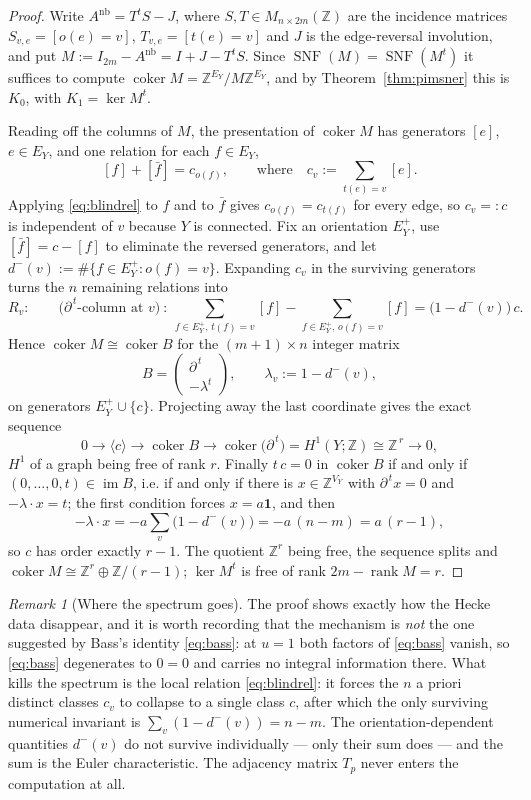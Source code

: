 \documentclass[11pt]{amsart}
\numberwithin{equation}{section}
\theoremstyle{definition}
\theoremstyle{remark}
\newtheorem{remark}[theorem]{Remark}
\newcommand{\Z}{\mathbb{Z}}
\newcommand{\coker}{\operatorname{coker}}
\newcommand{\SNF}{\operatorname{SNF}}
\newcommand{\rank}{\operatorname{rank}}
\begin{document}
\begin{proof}
Write $A^{\mathrm{nb}}=T^{t}S-J$, where $S,T\in M_{n\times2m}(\Z)$ are the incidence
matrices $S_{v,e}=[o(e)=v]$, $T_{v,e}=[t(e)=v]$ and $J$ is the edge-reversal involution,
and put $M:=I_{2m}-A^{\mathrm{nb}}=I+J-T^{t}S$. Since $\SNF(M)=\SNF(M^{t})$ it suffices
to compute $\coker M=\Z^{E_Y}/M\Z^{E_Y}$, and by Theorem~\ref{thm:pimsner} this is
$K_0$, with $K_1=\ker M^t$.

Reading off the columns of $M$, the presentation of $\coker M$ has generators $[e]$,
$e\in E_Y$, and one relation for each $f\in E_Y$,
\begin{equation}\label{eq:blindrel}
[f]+[\bar f]=c_{o(f)},\qquad\text{where}\quad c_v:=\sum_{t(e)=v}[e].
\end{equation}
Applying \eqref{eq:blindrel} to $f$ and to $\bar f$ gives $c_{o(f)}=c_{t(f)}$ for every
edge, so $c_v=:c$ is independent of $v$ because $Y$ is connected. Fix an orientation
$E_Y^+$, use $[\bar f]=c-[f]$ to eliminate the reversed generators, and let
$d^-(v):=\#\{f\in E_Y^+:o(f)=v\}$. Expanding $c_v$ in the surviving generators turns the
$n$ remaining relations into
\[
R_v:\qquad \bigl(\partial^{\,t}\text{-column at }v\bigr)\ :\
\sum_{f\in E_Y^+,\,t(f)=v}[f]-\sum_{f\in E_Y^+,\,o(f)=v}[f]
=\bigl(1-d^-(v)\bigr)\,c .
\]
Hence $\coker M\cong\coker B$ for the $(m+1)\times n$ integer matrix
\[
B=\begin{pmatrix}\partial^{\,t}\\ -\lambda^{t}\end{pmatrix},
\qquad \lambda_v:=1-d^-(v),
\]
on generators $E_Y^+\cup\{c\}$. Projecting away the last coordinate gives the exact
sequence
\[
0\longrightarrow\langle c\rangle\longrightarrow\coker B
\longrightarrow\coker\bigl(\partial^{\,t}\bigr)=H^1(Y;\Z)\cong\Z^{\,r}
\longrightarrow0 ,
\]
$H^1$ of a graph being free of rank $r$. Finally $t\,c=0$ in $\coker B$ if and only if
$(0,\dots,0,t)\in\operatorname{im}B$, i.e. if and only if there is $x\in\Z^{V_Y}$ with
$\partial^{\,t}x=0$ and $-\lambda\cdot x=t$; the first condition forces $x=a\mathbf1$,
and then
\[
-\lambda\cdot x=-a\sum_{v}\bigl(1-d^-(v)\bigr)=-a\,(n-m)=a\,(r-1),
\]
so $c$ has order exactly $r-1$. The quotient $\Z^r$ being free, the sequence splits and
$\coker M\cong\Z^{r}\oplus\Z/(r-1)$; $\ker M^t$ is free of rank $2m-\rank M=r$.
\end{proof}

\begin{remark}[Where the spectrum goes]\label{rem:wherespectrum}
The proof shows exactly how the Hecke data disappear, and it is worth recording that the
mechanism is \emph{not} the one suggested by Bass's identity \eqref{eq:bass}: at $u=1$
both factors of \eqref{eq:bass} vanish, so \eqref{eq:bass} degenerates to $0=0$ and
carries no integral information there. What kills the spectrum is the local relation
\eqref{eq:blindrel}: it forces the $n$ a priori distinct classes $c_v$ to collapse to a
single class $c$, after which the only surviving numerical invariant is
$\sum_v(1-d^-(v))=n-m$. The orientation-dependent quantities $d^-(v)$ do not survive
individually --- only their sum does --- and the sum is the Euler characteristic. The
adjacency matrix $T_p$ never enters the computation at all.
\end{remark}
\end{document}
